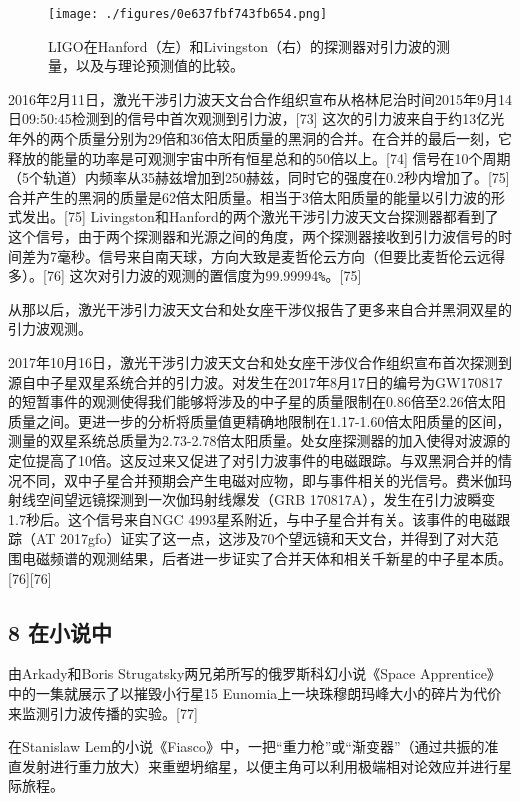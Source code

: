 \begin{figure}[ht]
\centering
\texttt{[image: ./figures/0e637fbf743fb654.png]}
\caption{LIGO在Hanford（左）和Livingston（右）的探测器对引力波的测量，以及与理论预测值的比较。} \label{fig_YLB_12}
\end{figure}

2016年2月11日，激光干涉引力波天文台合作组织宣布从格林尼治时间2015年9月14日09:50:45检测到的信号中首次观测到引力波，[73] 这次的引力波来自于约13亿光年外的两个质量分别为29倍和36倍太阳质量的黑洞的合并。在合并的最后一刻，它释放的能量的功率是可观测宇宙中所有恒星总和的50倍以上。[74] 信号在10个周期（5个轨道）内频率从35赫兹增加到250赫兹，同时它的强度在0.2秒内增加了。[75] 合并产生的黑洞的质量是62倍太阳质量。相当于3倍太阳质量的能量以引力波的形式发出。[75] Livingston和Hanford的两个激光干涉引力波天文台探测器都看到了这个信号，由于两个探测器和光源之间的角度，两个探测器接收到引力波信号的时间差为7毫秒。信号来自南天球，方向大致是麦哲伦云方向（但要比麦哲伦云远得多）。[76] 这次对引力波的观测的置信度为99.99994\verb|%|。[75]

从那以后，激光干涉引力波天文台和处女座干涉仪报告了更多来自合并黑洞双星的引力波观测。

2017年10月16日，激光干涉引力波天文台和处女座干涉仪合作组织宣布首次探测到源自中子星双星系统合并的引力波。对发生在2017年8月17日的编号为GW170817的短暂事件的观测使得我们能够将涉及的中子星的质量限制在0.86倍至2.26倍太阳质量之间。更进一步的分析将质量值更精确地限制在1.17-1.60倍太阳质量的区间，测量的双星系统总质量为2.73-2.78倍太阳质量。处女座探测器的加入使得对波源的定位提高了10倍。这反过来又促进了对引力波事件的电磁跟踪。与双黑洞合并的情况不同，双中子星合并预期会产生电磁对应物，即与事件相关的光信号。费米伽玛射线空间望远镜探测到一次伽玛射线爆发（GRB 170817A），发生在引力波瞬变1.7秒后。这个信号来自NGC 4993星系附近，与中子星合并有关。该事件的电磁跟踪（AT 2017gfo）证实了这一点，这涉及70个望远镜和天文台，并得到了对大范围电磁频谱的观测结果，后者进一步证实了合并天体和相关千新星的中子星本质。[76][76]

\subsection{8 在小说中}

由Arkady和Boris Strugatsky两兄弟所写的俄罗斯科幻小说《Space Apprentice》中的一集就展示了以摧毁小行星15 Eunomia上一块珠穆朗玛峰大小的碎片为代价来监测引力波传播的实验。[77]

在Stanislaw Lem的小说《Fiasco》中，一把“重力枪”或“渐变器”（通过共振的准直发射进行重力放大）来重塑坍缩星，以便主角可以利用极端相对论效应并进行星际旅程。

